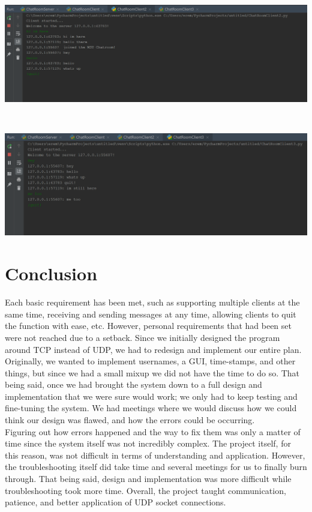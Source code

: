 \documentclass[12pt]{report}
\begin{document}
\begin{center}
\includegraphics[scale=.2]{chatroom-app-02.png}\\
\end{center} \\

\begin{center}
\includegraphics[scale=.2]{chatroom-app-03.png}\\
\end{center}

\section{Conclusion}
Each basic requirement has been met, such as supporting multiple clients at the same time, receiving and sending messages at any time, allowing clients to quit the function with ease, etc. However, personal requirements that had been set were not reached due to a setback. Since we initially designed the program around TCP instead of UDP, we had to redesign and implement our entire plan. Originally, we wanted to implement usernames, a GUI, time-stamps, and other things, but since we had a small mixup we did not have the time to do so. That being said, once we had brought the system down to a full design and implementation that we were sure would work; we only had to keep testing and fine-tuning the system. We had meetings where we would discuss how we could think our design was flawed, and how the errors could be occurring. \\

\noindent
Figuring out how errors happened and the way to fix them was only a matter of time since the system itself was not incredibly complex. The project itself, for this reason, was not difficult in terms of understanding and application. However, the troubleshooting itself did take time and several meetings for us to finally burn through. That being said, design and implementation was more difficult while troubleshooting took more time. Overall, the project taught communication, patience, and better application of UDP socket connections.
\end{document}
